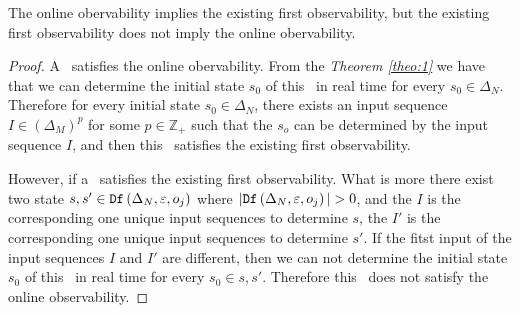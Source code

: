 \begin{theorem}
The online obervability implies the existing first observability, but the existing first observability does not imply the online obervability.
\label{theo:2}
\end{theorem}
\begin{proof}
A \BCN\ satisfies the online obervability. From the {\em Theorem \ref{theo:1}} we have that we can determine the initial state $s_0$ of this \BCN\ in real time for every $s_0\in \Delta_N$. Therefore for every initial state $s_0 \in \Delta_N$, there exists an input sequence $I\in(\Delta_M)^p$ for some $p\in \mathbb{Z}_+$ such that the $s_o$ can be determined by the input sequence $I$, and then this \BCN\ satisfies the existing first observability.

However, if a \BCN\ satisfies the existing first observability. What is more there exist two state $s, s'\in{\tt Df}\left(\Delta_N,\varepsilon, o_j\right)$ where $|\Ded\left(\Delta_N,\varepsilon, o_j\right)|> 0$, and the $I$ is the corresponding one unique input sequences to determine $s$, the $I'$ is the corresponding one unique input sequences to determine $s'$. If the fitst input of the input sequences $I$ and $I'$ are different, then we can not determine the initial state $s_0$ of this \BCN\ in real time for every $s_0\in {s,s'}$. Therefore this \BCN\ does not satisfy the online observability.
\end{proof}

